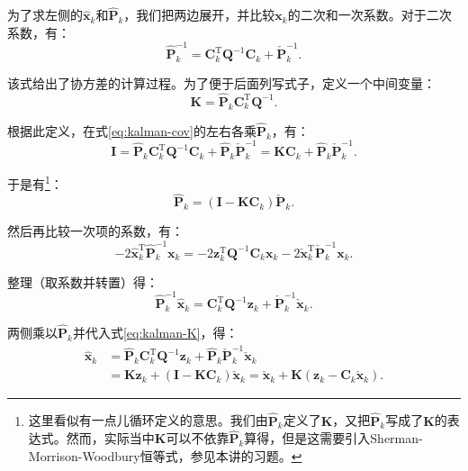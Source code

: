 为了求左侧的$\hat{\bm{x}}_k$和$\bm{\hat{P}}_k$，我们把两边展开，并比较$\bm{x}_k$的二次和一次系数。对于二次系数，有：
\begin{equation}
\label{eq:kalman-cov}
\hat{\bm{P}}_k^{ - 1} = \bm{C}_k^\mathrm{T}{\bm{Q}^{ - 1}}{\bm{C}_k} + \check {\bm{P}}_k^{ - 1}.
\end{equation}

该式给出了协方差的计算过程。为了便于后面列写式子，定义一个中间变量：
\begin{equation}
\label{eq:kalman-K}
\bm{K} = \bm{\hat{P}}_k \bm{C}_k^\mathrm{T} \bm{Q}^{-1}.
\end{equation}

根据此定义，在式\eqref{eq:kalman-cov}的左右各乘$\bm{\hat{P}}_k$，有：
\begin{equation}
\bm{I} = \bm{\hat{P}}_k \bm{C}_k^\mathrm{T} \bm{Q}^{-1} \bm{C}_k + \bm{\hat{P}}_k \bm{\check{P}}_k^{-1} = \bm{K} \bm{C}_k + \bm{\hat{P}}_k \bm{\check{P}}_k^{-1}.
\end{equation}

于是有\footnote{这里看似有一点儿循环定义的意思。我们由$\bm{\hat{P}}_k$定义了$\bm{K}$，又把$\bm{\hat{P}}_k$写成了$\bm{K}$的表达式。然而，实际当中$\bm{K}$可以不依靠$\bm{\hat{P}}_k$算得，但是这需要引入Sherman-Morrison-Woodbury恒等式\cite{Sherman1950}，参见本讲的习题。}：
\begin{equation}
\bm{\hat{P}}_k = ( \bm{I} - \bm{K} \bm{C}_k ) \bm{\check{P}}_k.
\end{equation}

然后再比较一次项的系数，有：
\begin{equation}
- 2\hat {\bm{x}}_k^\mathrm{T} \hat{\bm{P}}_k^{ - 1}{\bm{x}_k} =  - 2\bm{z}_k^\mathrm{T} {\bm{Q}^{ - 1}}{\bm{C}_k}{\bm{x}_k} - 2\bm{\check {x}}_k^\mathrm{T} \bm{\check {P}}_k^{ - 1}{\bm{x}_k}.
\end{equation}

整理（取系数并转置）得：
\begin{equation}
\hat { \bm{P}}_k^{ - 1}{{\hat{\bm{x}}}_k} = \bm{C}_k^\mathrm{T} {\bm{Q}^{ - 1}}{\bm{z}_k} + \check{\bm{P}}_k^{ - 1}{{\bm{\check{x}}}_k}.
\end{equation}

两侧乘以$\bm{\hat{P}}_k$并代入式\eqref{eq:kalman-K}，得：
\begin{align}
{{\bm{\hat {x}}}_k} &= {{\hat {\bm{P}}}_k} \bm{C}_k^\mathrm{T} { \bm{Q}^{ - 1}}{\bm{z}_k} + {{\bm{\hat{ P}}}_k}\check {\bm{P}}_k^{ - 1}{{\check {\bm{x}}}_k}\\
&= \bm{K} {\bm{z}_k} + \left( {\bm{I} - \bm{K}{\bm{C}_k}} \right){{\bm{\check {x}}}_k} = {{\check {\bm{x}}}_k} + \bm{K} \left( {\bm{z}_k - {\bm{C}_k}{\bm{\check{x}}_k}} \right).
\end{align}

